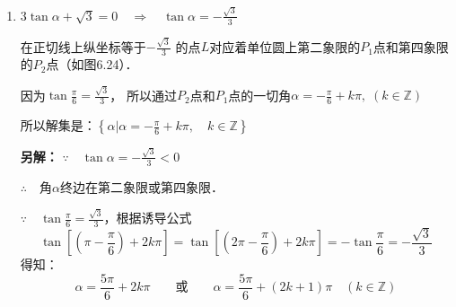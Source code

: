 \begin{solution}
\begin{enumerate}
\textbf{另解：}$\because\quad \cos\frac{\alpha}{2}=-\frac{1}{2}<0$，

$\therefore\quad $角$\frac{\alpha}{2}$的终边在
第二象限或第三象限．

$\because\quad \cos\frac{\pi}{3}=\frac{1}{2}$，根据诱导公式
\[\cos\left[\left(\pi-\frac{\pi}{3}\right)+2k\pi\right]=\cos\left[\left(\pi+\frac{\pi}{3}\right)+2k\pi\right]=-\cos\frac{\pi}{3}=-\frac{1}{2}\]
得知：$\frac{\alpha}{2}=\frac{2\pi}{3}+2k\pi\quad \text{或}\quad \frac{\alpha}{2}=\frac{4\pi}{3}+2k\pi$

\[\therefore\quad \alpha=\frac{4\pi}{3}+4k\pi\qquad \text{或}\qquad  \alpha =\frac{8\pi}{3}+4k\pi\quad  (k\in\mathbb{Z})\]

\item $3\tan\alpha+\sqrt{3}=0\quad \Rightarrow\quad \tan\alpha=-\frac{\sqrt{3}}{3}$

在正切线上纵坐标等于$-\frac{\sqrt{3}}{3}$
的点$L$对应着单位圆上第二象限的$P_1$点和第四象限的$P_2$点（如图6.24）．
\begin{figure}[htp]
    \centering
{}
    \caption{}
\end{figure}

因为$\tan\frac{\pi}{6}=\frac{\sqrt{3}}{3}$，
所以通过$P_2$点和$P_1$点的一切角$\alpha=-\frac{\pi}{6}+k\pi,\; (k\in\mathbb{Z})$

所以解集是：$\left\{\alpha\Big|\alpha=-\frac{\pi}{6}+k\pi,\quad k\in\mathbb{Z}\right\}$

\textbf{另解：} $\because\quad \tan\alpha=-\frac{\sqrt{3}}{3}<0$

$\therefore\quad $角$\alpha$终边在第二象限或第四象限．

$\because\quad \tan\frac{\pi}{6}=\frac{\sqrt{3}}{3}$，根据诱导公式
\[\tan\left[\left(\pi-\frac{\pi}{6}\right)+2k\pi\right]=\tan\left[\left(2\pi-\frac{\pi}{6}\right)+2k\pi\right]=-\tan\frac{\pi}{6}=-\frac{\sqrt{3}}{3}\]
得知：
\[\alpha=\frac{5\pi}{6}+2k\pi\qquad \text{或}\qquad \alpha=\frac{5\pi}{6}+(2k+1)\pi\quad (k\in\mathbb{Z})\]
\end{enumerate}
\end{solution}

